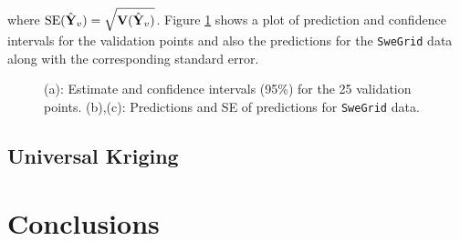 \documentclass[a4paper,10pt]{article}
\def\bY{{\bf Y}}
\def\bV{{\bf V}}
\begin{document}
where $\text{SE}(\hat \bY_v) = \sqrt{\bV(\hat \bY_v)}$. Figure \ref{fig:olsresults} shows a plot of prediction and confidence intervals for the validation points and also the predictions for the {\texttt{SweGrid}} data along with the corresponding standard error.
\begin{figure}[ht]
\centering
  \qquad
  \qquad
  \caption{(a): Estimate and confidence intervals (95\%) for the 25 validation points. (b),(c): Predictions and SE of predictions for \texttt{SweGrid} data.}
\label{fig:olsresults}
\end{figure}

\subsection{Universal Kriging}

\section{Conclusions}
\end{document}
